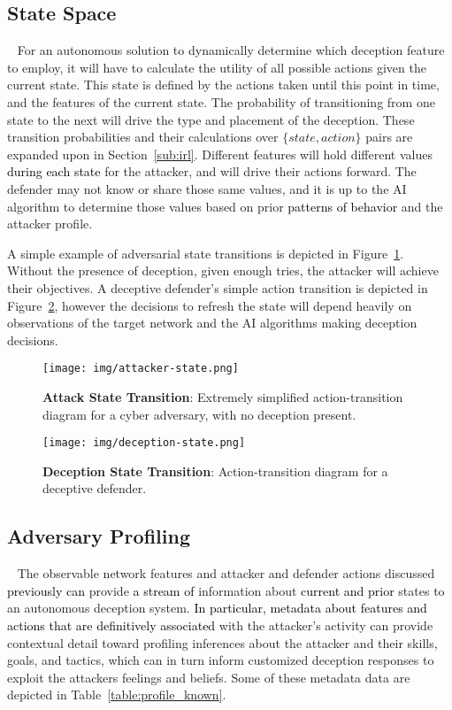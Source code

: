 \documentclass{article}
\newcommand\nnn[1]{\textcolor{black}{#1}}
\begin{document}
\subsection{State Space}~\label{sub:state}
For an autonomous solution to dynamically determine which deception feature to employ, it will have to calculate the utility of all possible actions given the current state. This state is defined by the actions taken until this point in time, and the features of the current state. The probability of transitioning from one state to the next will drive the type and placement of the deception. These transition probabilities and their calculations over $\{state, action\}$ pairs are expanded upon in Section~\ref{sub:irl}. Different features will hold different values \nnn{during each state} for the attacker, and will drive their actions forward. The defender may not know or share those same values, and it is up to the AI algorithm to determine those values based on prior \nnn{patterns of behavior} and the attacker profile.

A simple example of adversarial state transitions is depicted in Figure~\ref{fig:attacker_state}. Without the presence of deception, given enough tries, the attacker will achieve their objectives. A deceptive defender's simple action transition is depicted in Figure~\ref{fig:deception_state}, however the decisions to refresh the state will depend heavily on observations of the target network and the AI algorithms making deception decisions.

\begin{figure}[!h]
	\texttt{[image: img/attacker-state.png]}
	\caption{\textbf{Attack State Transition}: Extremely simplified action-transition diagram for a cyber adversary, with no deception present.}
	\label{fig:attacker_state}
\end{figure}

\begin{figure}[!h]
	\texttt{[image: img/deception-state.png]}
	\caption{\textbf{Deception State Transition}: Action-transition diagram for a deceptive defender.}
	\label{fig:deception_state}
\end{figure}

\subsection{Adversary Profiling}~\label{sub:profile}
The observable network features and attacker and defender actions discussed \nnn{previously can} provide \nnn{a stream of} information about \nnn{current and prior} states to an autonomous deception system. 
\nnn{In particular, metadata about features and actions that are definitively associated} with the attacker's activity can provide contextual detail toward profiling inferences about the attacker and their skills, goals, and tactics, which can in turn inform customized deception responses to exploit the attackers feelings and beliefs. 
Some of these metadata data are depicted in Table~\ref{table:profile_known}.
\end{document}
